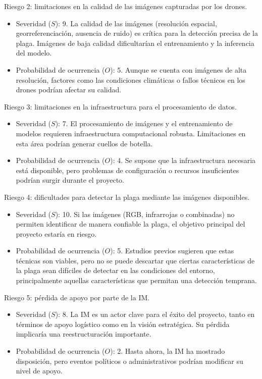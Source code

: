 \documentclass[
11pt, %
]{charter}
\begin{document}
Riesgo 2: limitaciones en la calidad de las imágenes capturadas por los drones.
\begin{itemize}
  \item Severidad ($S$): 9. La calidad de las imágenes (resolución espacial, georreferenciación, ausencia de ruido) es crítica para la detección precisa de la plaga. Imágenes de baja calidad dificultarían el entrenamiento y la inferencia del modelo.
  \item Probabilidad de ocurrencia ($O$): 5. Aunque se cuenta con imágenes de alta resolución, factores como las condiciones climáticas o fallos técnicos en los drones podrían afectar su calidad.
\end{itemize}

Riesgo 3: limitaciones en la infraestructura para el procesamiento de datos.
\begin{itemize}
  \item Severidad ($S$): 7. El procesamiento de imágenes y el entrenamiento de modelos requieren infraestructura computacional robusta. Limitaciones en esta área podrían generar cuellos de botella.
  \item Probabilidad de ocurrencia ($O$): 4. Se supone que la infraestructura necesaria está disponible, pero problemas de configuración o recursos insuficientes podrían surgir durante el proyecto.
\end{itemize}

Riesgo 4: dificultades para detectar la plaga mediante las imágenes disponibles.
\begin{itemize}
  \item Severidad ($S$): 10. Si las imágenes (RGB, infrarrojas o combinadas) no permiten identificar de manera confiable la plaga, el objetivo principal del proyecto estaría en riesgo.
  \item Probabilidad de ocurrencia ($O$): 5. Estudios previos sugieren que estas técnicas son viables, pero no se puede descartar que ciertas características de la plaga sean difíciles de detectar en las condiciones del entorno, principalmente aquellas características que permitan una detección temprana.
\end{itemize}

Riesgo 5: pérdida de apoyo por parte de la IM.
\begin{itemize}
  \item Severidad ($S$): 8. La IM es un actor clave para el éxito del proyecto, tanto en términos de apoyo logístico como en la visión estratégica. Su pérdida implicaría una reestructuración importante.
  \item Probabilidad de ocurrencia ($O$): 2. Hasta ahora, la IM ha mostrado disposición, pero eventos políticos o administrativos podrían modificar su nivel de apoyo.
\end{itemize}
\end{document}
